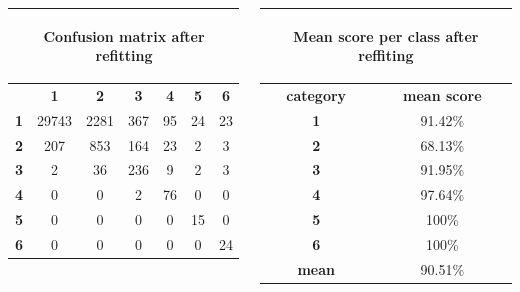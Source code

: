 \documentclass[c]{beamer}
\begin{document}
\begin{frame}
\begin{columns}
\begin{column}{0.7\textwidth}
  \begin{table}
  \begin{center}
  \begin{adjustbox}{max width=0.6\textwidth}
  {\tiny
  \begin{tabular}{|c|c|c|c|c|c|c|}
    \hline
    \multicolumn{7}{|c|}{{\tiny \begin{bf}Confusion matrix after refitting\end{bf}}} \\
    \hline
     & \textbf{1} & \textbf{2} & \textbf{3} & \textbf{4} & \textbf{5} & \textbf{6}\\
    \hline
    \textbf{1} & 29743 & 2281 & 367 & 95 & 24 & 23\\
    \hline
    \textbf{2} & 207 & 853 & 164 & 23 & 2 & 3\\
    \hline
    \textbf{3} & 2 & 36 & 236 & 9 & 2 & 3\\
    \hline
    \textbf{4} & 0 & 0 & 2 & 76 & 0 & 0\\
    \hline
    \textbf{5} & 0 & 0 & 0 & 0 & 15 & 0\\
    \hline
    \textbf{6} & 0 & 0 & 0 & 0 & 0 & 24\\
    \hline
  \end{tabular}
  }
  \end{adjustbox}
  \end{center}
  \end{table}
\end{column}
\begin{column}{0.5\textwidth}
   \begin{table}
    \begin{center}
    \begin{adjustbox}{max width=0.5\textwidth}
    {\tiny 
    \begin{tabular}{|c|c|}
      \hline
      \multicolumn{2}{|c|}{\begin{bf}Mean score per class after reffiting\end{bf}} \\
      \hline
      \textbf{category} & \textbf{mean score}\\
      \hline
      \textbf{1} & 91.42\% \\
      \hline
      \textbf{2} & 68.13\% \\
      \hline
      \textbf{3} & 91.95\% \\
      \hline
      \textbf{4} & 97.64\% \\
      \hline
      \textbf{5} & 100\% \\
      \hline
      \textbf{6} & 100\% \\
      \hline
      \textbf{mean} & 90.51\% \\
      \hline
    \end{tabular}
    }
    \end{adjustbox}
    \end{center}
  \end{table}
\end{column}
\end{columns}
\end{frame}
\end{document}
